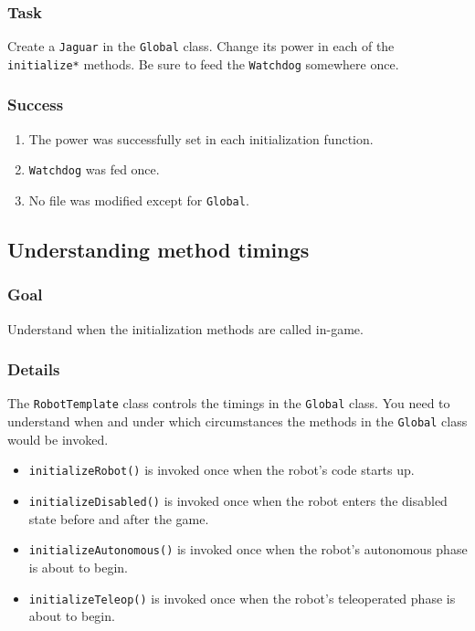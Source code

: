 \documentclass[a4paper]{article}
\begin{document}
\subsubsection{Task} Create a \lstinline{Jaguar} in the \lstinline{Global} class. Change its power in each of the \lstinline{initialize*} methods. Be sure to feed the \lstinline{Watchdog} somewhere once.
\subsubsection{Success} \begin{enumerate}\item{The power was successfully set in each initialization function.}\item{\lstinline{Watchdog} was fed once.}\item{No file was modified except for \lstinline{Global}.}\end{enumerate}

\pagebreak\subsection{Understanding method timings}
\subsubsection{Goal} Understand when the initialization methods are called in-game.
\subsubsection{Details} The \lstinline{RobotTemplate} class controls the timings in the \lstinline{Global} class. You need to understand when and under which circumstances the methods in the \lstinline{Global} class would be invoked. \begin{itemize}\item{\lstinline{initializeRobot()} is invoked once when the robot's code starts up.}\item{\lstinline{initializeDisabled()} is invoked once when the robot enters the disabled state before and after the game.}\item{\lstinline{initializeAutonomous()} is invoked once when the robot's autonomous phase is about to begin.}\item{\lstinline{initializeTeleop()} is invoked once when the robot's teleoperated phase is about to begin.}\end{itemize}
\end{document}

